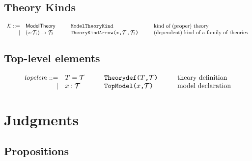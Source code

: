 \documentclass[12pt]{article}
\newcommand{\rulesec}[2]{\subsection*{{\bf#1}\hfill\fbox{$#2$}}}
\newcommand{\X}{\x} %
\newcommand{\n}{x} %
\newcommand{\p}{\psi} %
\newcommand{\pt}{\sigma} %
\newcommand{\x}{\n} %
\newcommand{\T}{\ensuremath{\mathcal T}}
\renewcommand{\t}{T}
\newcommand{\tk}{\ensuremath{\mathcal K}}
\newcommand{\tkModel}{\mathsf{ModelTheory}}
\newcommand{\tkArrow}[3]{(#1{:}#2)\to #3}
\newcommand{\G}{\Gamma}
\newcommand{\wf}[3]{#1 \vdash #2\ :\ #3}
\begin{document}
\subsection{Theory Kinds}
\[
\begin{array}{rl@{\hspace{1cm}}l@{\hspace{1cm}}l}
\tk ::= & \tkModel & \texttt{ModelTheoryKind} & \mbox{kind of (proper) theory}\\
 |& \tkArrow{\X}{\T_1}{\T_2} & \texttt{TheoryKindArrow($\X$,$\T_1$,$\T_2$)} & \mbox{(dependent) kind of a family of theories}
\end{array}
\]

\subsection{Top-level elements}

\[
\begin{array}{rl@{\hspace{1cm}}l@{\hspace{1cm}}l}
\mathit{topelem} ::= & \t = \T & \texttt{Theorydef($\t$,$\T$)} & \mbox{theory definition}\\
|&\X : \T& \texttt{TopModel($\X$,$\T$)}&\mbox{model declaration}\\
\end{array}
\]

\section{Judgments}

\rulesec{Propositions}{\wf{\G}{\p}{\pt}}
\end{document}
